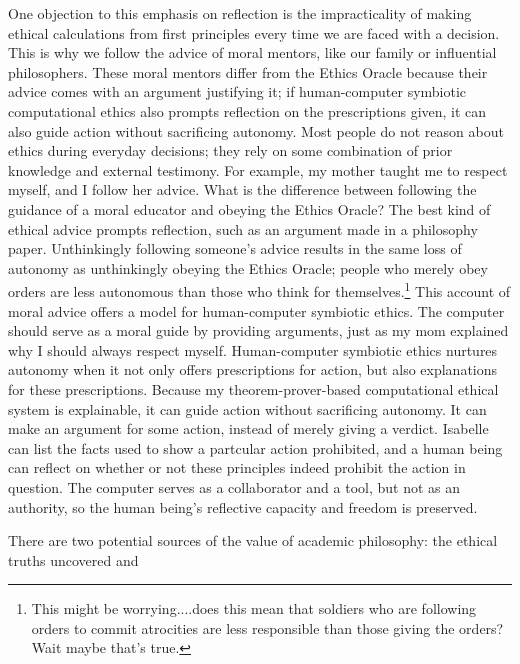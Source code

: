 \begin{isabellebody}
\begin{isamarkuptext}
One objection to this emphasis on reflection is the impracticality of making ethical calculations from first principles 
every time we are faced with a decision. This is why we follow the advice of moral mentors, like our 
family or influential philosophers. These moral mentors differ from the Ethics Oracle because their advice 
comes with an argument justifying it; if human-computer symbiotic computational ethics also prompts 
reflection on the prescriptions given, it can also guide action without sacrificing autonomy.
Most people do not reason about ethics during everyday decisions; they rely on some combination of 
prior knowledge and external testimony. For example, my mother taught me to respect myself, and I 
follow her advice. What is the difference between following the guidance of a moral educator and 
obeying the Ethics Oracle? The best kind of ethical advice prompts reflection, such as an argument 
made in a philosophy paper. Unthinkingly following someone’s advice results in the same loss of 
autonomy as unthinkingly obeying the Ethics Oracle; people who merely obey orders are less autonomous 
than those who think for themselves.\footnote{This might be worrying....does this mean that soldiers who are
following orders to commit atrocities are less responsible than those giving the orders? Wait 
maybe that's true.} This account of moral advice offers a model for human-computer 
symbiotic ethics. The computer should serve as a moral guide by providing arguments, just as my mom 
explained why I should always respect myself. Human-computer symbiotic 
ethics nurtures autonomy when it not only offers prescriptions for action, but also explanations for 
these prescriptions. Because my theorem-prover-based computational ethical system is explainable, it can 
guide action without sacrificing autonomy. It can make an argument for some action, instead of 
merely giving a verdict. Isabelle can list the facts used to show
a partcular action prohibited, and a human being can reflect on whether or not these principles
indeed prohibit the action in question. The computer serves as a collaborator and a tool, but not as an authority, 
so the human being’s reflective capacity and freedom is preserved.%
\end{isamarkuptext}\isamarkuptrue%
%
\isadelimdocument
%
\endisadelimdocument
%
\isatagdocument
%
\isamarkuptrue%
%
\endisatagdocument
{\isafolddocument}%
%
\isadelimdocument
%
\endisadelimdocument
%
\begin{isamarkuptext}%
There are two potential sources of the value of academic philosophy: the ethical truths uncovered and 

\end{isamarkuptext}
\end{isabellebody}

